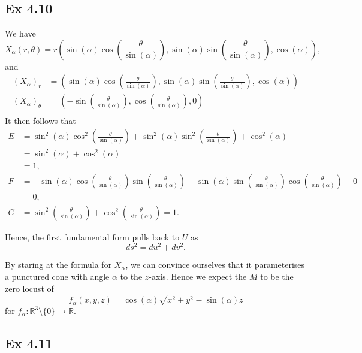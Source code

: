 \documentclass{article}
\theoremstyle{definition}
\newcommand{\R}{\mathbb{R}}
\begin{document}
\subsection*{Ex 4.10}

We have 
\[
	X_{\alpha}(r, \theta)
	=
	r \left(
		\sin(\alpha)
		\cos\left(\frac{\theta}{\sin(\alpha)}\right),
		\sin(\alpha)
		\sin\left(\frac{\theta}{\sin(\alpha)}\right),
		\cos(\alpha)
	\right),
\] 
and
\begin{align*}
	(X_{\alpha})_r
	&=
	\left(
		\sin(\alpha)
		\cos\left(\frac{\theta}{\sin(\alpha)}\right),
		\sin(\alpha)
		\sin\left(\frac{\theta}{\sin(\alpha)}\right),
		\cos(\alpha)
	\right) \\
	(X_{\alpha})_{\theta}
	&=
	\left(
		-\sin\left(\frac{\theta}{\sin(\alpha)}\right),
		\cos\left(\frac{\theta}{\sin(\alpha)}\right),
		0
	\right) \\
\end{align*}
It then follows that 
\begin{align*}
	E 
	&= 
	\sin^2(\alpha)
	\cos^2\left(\frac{\theta}{\sin(\alpha)}\right)
	+
	\sin^2(\alpha)
	\sin^2\left(\frac{\theta}{\sin(\alpha)}\right)
	+
	\cos^2(\alpha) \\
	&=
	\sin^2(\alpha)
	+
	\cos^2(\alpha) \\
	&=
	1, \\
	F
	&=
	-\sin(\alpha)
	\cos\left(\frac{\theta}{\sin(\alpha)}\right)
	\sin\left(\frac{\theta}{\sin(\alpha)}\right)
	+
	\sin(\alpha)
	\sin\left(\frac{\theta}{\sin(\alpha)}\right)
	\cos\left(\frac{\theta}{\sin(\alpha)}\right)
	+
	0 \\
	&=
	0, \\
	G
	&=
	\sin^2\left(\frac{\theta}{\sin(\alpha)}\right)
	+
	\cos^2\left(\frac{\theta}{\sin(\alpha)}\right)
	=
	1.
\end{align*}

Hence, the first fundamental form pulls back to $U$ as
\[
	ds^2 = du^2 + dv^2.
\] 

By staring at the formula for $X_{\alpha}$, we can convince ourselves that it
parameterises a punctured cone with angle $\alpha$ to the $z$-axis. Hence we
expect the $M$ to be the zero locust of 
\[
	f_{\alpha}(x, y, z)
	=
	\cos(\alpha)\sqrt{x^2 + y^2} - \sin(\alpha) z
\] 
for $f_{\alpha} : \R^3 \setminus \{0\} \to \R$.

\subsection*{Ex 4.11}
\end{document}

